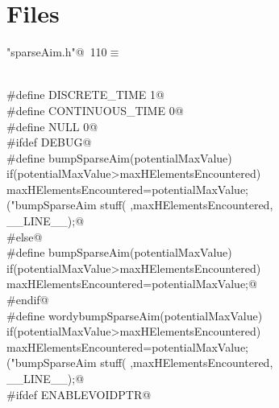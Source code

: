 \documentclass{article}
\begin{document}
\section{Files}
\label{sec:files}
\label{includeFile}
\begin{flushleft} \small
\begin{minipage}{\linewidth}\label{scrap193}\raggedright\small
{} \verb@"sparseAim.h"@\nobreak\ {\footnotesize {110}}$\equiv$
\vspace{-1ex}
\begin{list}{}{} \item
\mbox{}\verb@@\\
\mbox{}\verb@#define DISCRETE_TIME 1@\\
\mbox{}\verb@#define CONTINUOUS_TIME 0@\\
\mbox{}\verb@#define NULL 0@\\
\mbox{}\verb@#ifdef DEBUG@\\
\mbox{}\verb@#define bumpSparseAim(potentialMaxValue) \@\\
\mbox{}\verb@   if(potentialMaxValue>maxHElementsEncountered) \@\\
\mbox{}\verb@   maxHElementsEncountered=potentialMaxValue;\@\\
\mbox{}\verb@printf("bumpSparseAim stuff(%d,%d) at line %d",\@\\
\mbox{}\verb@potentialMaxValue,maxHElementsEncountered,\@\\
\mbox{}\verb@__LINE__);@\\
\mbox{}\verb@#else@\\
\mbox{}\verb@#define bumpSparseAim(potentialMaxValue) \@\\
\mbox{}\verb@   if(potentialMaxValue>maxHElementsEncountered) \@\\
\mbox{}\verb@   maxHElementsEncountered=potentialMaxValue;@\\
\mbox{}\verb@#endif@\\
\mbox{}\verb@#define wordybumpSparseAim(potentialMaxValue) \@\\
\mbox{}\verb@   if(potentialMaxValue>maxHElementsEncountered) \@\\
\mbox{}\verb@   maxHElementsEncountered=potentialMaxValue;\@\\
\mbox{}\verb@printf("bumpSparseAim stuff(%d,%d) at line %d",\@\\
\mbox{}\verb@potentialMaxValue,maxHElementsEncountered,\@\\
\mbox{}\verb@__LINE__);@\\
\mbox{}\verb@#ifdef ENABLEVOIDPTR@\\

\end{list}
\end{minipage}
\end{flushleft}
\end{document}
